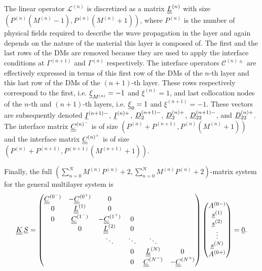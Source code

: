 The linear operator $\mathcal L^{(n)}$ is discretized as a matrix $\underline{\underline{L}}^{(n)}$ with size $(P^{(n)} (M^{(n)} - 1), P^{(n)} (M^{(n)} + 1))$, where $P^{(n)}$ is the number of physical fields required to describe the wave propagation in the layer and again depends on the nature of the material this layer is composed of. The first and the last rows of the DMs are removed because they are used to apply the interface conditions at $\Gamma^{(n+1)}$ and $\Gamma^{(n)}$ respectively. The interface operators $\mathcal C^{(n)\pm}$ are effectively expressed in terms of this first row of the DMs of the $n$-th layer and this last row of the DMs of the $(n+1)$-th layer. These rows respectively correspond to the first, i.e. $\underline{\xi}_{M^{(n)}}=-1$ and $\xi^{(n)}=1$, and last collocation nodes of the $n$-th and $(n+1)$-th layers, i.e. $\underline{\xi}_0=1$ and $\xi^{(n+1)}=-1$.  These vectors are subsequently denoted $\underline{I}^{(n+1)-}$, $\underline{I}^{(n)+}$, $\underline{D}_{2}^{(n+1)-}$, $\underline{D}_{2}^{(n)+}$, $\underline{D}_{22}^{(n+1)-}$, and $\underline{D}_{22}^{(n)+}$. The interface matrix $\underline{\underline{C}}^{(n)^-}$ is of size $(P^{(n)}+P^{(n+1)},P^{(n)}(M^{(n)}+1))$ and the interface matrix $\underline{\underline{C}}^{(n)^+}$ is of size $(P^{(n)}+P^{(n+1)},P^{(n+1)}(M^{(n+1)}+1))$.
    
Finally, the full $\left(\sum_{n=0}^N M^{(n)} P^{(n)} + 2,\sum_{n=0}^N M^{(n)} P^{(n)} + 2\right)$-matrix  system for the general multilayer system is
    \begin{equation} \underline{\underline{K}} \, \underline{S} = 
        \begin{pmatrix}
            \underline{\underline{C}}^{(0^-)} & -\underline{\underline{C}}^{(0^+)} & 0 & \\
            0 & \underline{\underline{L}}^{(1)} & 0 &  \\
            0 & \underline{\underline{C}}^{(1^-)} & -\underline{\underline{C}}^{(1^+)} & 0   & \\
            & 0 & \underline{\underline{L}}^{(2)}  & 0  & \\
            & & \ddots & \ddots & \ddots \\
            & & & 0 & \underline{\underline{L}}^{(N)}  & 0 \\
            & & & 0 & \underline{\underline{C}}^{(N^-)} & -\underline{\underline{C}}^{({N}^+)}
        \end{pmatrix}
        \begin{pmatrix}
                A^{(0-)} \\ \underline{s}^{(1)} \\ \underline{s}^{(2)} \\ \vdots \\ \underline{s}^{(N)} \\ A^{({0+})} 
        \end{pmatrix} = \underline{0}.
        \label{eq:discretized_multilayer_system}
    \end{equation}
    
